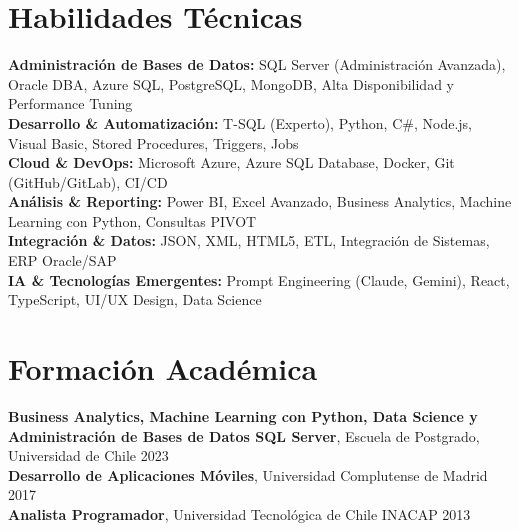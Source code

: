 \documentclass[11pt,letterpaper]{article}
\begin{document}
\section{Habilidades T\'{e}cnicas}
\textbf{Administración de Bases de Datos:} SQL Server (Administración Avanzada), Oracle DBA, Azure SQL, PostgreSQL, MongoDB, Alta Disponibilidad y Performance Tuning \\
\textbf{Desarrollo \& Automatización:} T-SQL (Experto), Python, C\#, Node.js, Visual Basic, Stored Procedures, Triggers, Jobs \\
\textbf{Cloud \& DevOps:} Microsoft Azure, Azure SQL Database, Docker, Git (GitHub/GitLab), CI/CD \\
\textbf{Análisis \& Reporting:} Power BI, Excel Avanzado, Business Analytics, Machine Learning con Python, Consultas PIVOT \\
\textbf{Integración \& Datos:} JSON, XML, HTML5, ETL, Integración de Sistemas, ERP Oracle/SAP \\
\textbf{IA \& Tecnologías Emergentes:} Prompt Engineering (Claude, Gemini), React, TypeScript, UI/UX Design, Data Science

\section{Formaci\'{o}n Acad\'{e}mica}
\textbf{Business Analytics, Machine Learning con Python, Data Science y Administración de Bases de Datos SQL Server}, Escuela de Postgrado, Universidad de Chile \hfill 2023 \\
\textbf{Desarrollo de Aplicaciones Móviles}, Universidad Complutense de Madrid \hfill 2017 \\
\textbf{Analista Programador}, Universidad Tecnológica de Chile INACAP \hfill 2013
\end{document}
